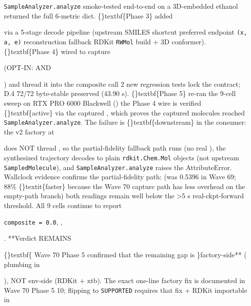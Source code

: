 \documentclass{article}
\begin{document}
\texttt{SampleAnalyzer.analyze} smoke-tested end-to-end on a 3D-embedded ethanol returned the full 6-metric dict. \{\}textbf\{Phase 3\} added

 via a 5-stage decode pipeline (upstream SMILES shortcut preferred  endpoint \texttt{(x, a, e)} reconstruction fallback  RDKit \texttt{RWMol} build + 3D conformer). \{\}textbf\{Phase 4\} wired  to capture

 (OPT-IN:  AND

) and thread it into the composite call  2 new regression tests lock the contract; D.4 72/72 byte-stable preserved (43.90 s). \{\}textbf\{Phase 5\} re-ran the 9-cell sweep on RTX PRO 6000 Blackwell ()  the Phase 4 wire is verified \{\}textbf\{active\} via the captured , which proves the captured molecules reached \texttt{SampleAnalyzer.analyze}. The failure is \{\}textbf\{downstream\} in the consumer: the v2 factory at

 does NOT thread , so the partial-fidelity fallback path runs (no real ), the synthesized trajectory decodes to plain \texttt{rdkit.Chem.Mol} objects (not upstream \texttt{SampledMolecule}), and \texttt{SampleAnalyzer.analyze} raises the AttributeError. Wallclock evidence confirms the partial-fidelity path:  (was 0.5396 in Wave 69; 88\% \{\}textit\{faster\} because the Wave 70 capture path has less overhead on the empty-path branch)  both readings remain well below the >5 s real-ckpt-forward threshold. All 9 cells continue to report

\texttt{composite = 0.0}, ,

. **Verdict REMAINS

\{\}textbf\{  Wave 70 Phase 5 confirmed that the remaining gap is \}factory-side** ( plumbing in

), NOT env-side (RDKit + xtb). The exact one-line factory fix is documented in Wave 70 Phase 5 10; flipping to \texttt{SUPPORTED} requires that fix + RDKit importable in
\end{document}
